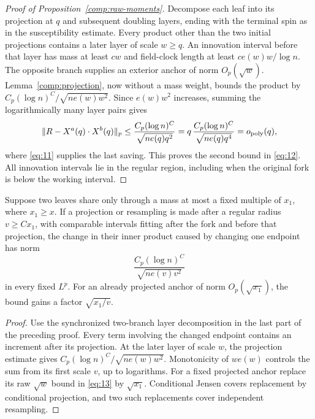 \begin{proof}[Proof of Proposition~\ref{comp:raw-moments}]
Decompose each leaf into its projection at $q$ and subsequent doubling
layers, ending with the terminal spin as in the susceptibility estimate.
Every product other than the two initial projections contains a later
layer of scale $w\ge q$.  An innovation interval before that layer has
mass at least $cw$ and field-clock length at least
$ce(w)w/\log n$.  The opposite branch supplies an exterior anchor of
norm $O_p(\sqrt w)$.  Lemma~\ref{comp:projection}, now without a
mass weight, bounds the product by
$C_p(\log n)^C/\sqrt{ne(w)w^2}$.
Since $e(w)w^2$ increases, summing the logarithmically many layer pairs
gives
\[
 \|R-X^a(q)\cdot X^b(q)\|_p
 \le\frac{C_p(\log n)^C}{\sqrt{ne(q)q^2}}
 =q\,\frac{C_p(\log n)^C}{\sqrt{ne(q)q^4}}
 =o_{\rm poly}(q),
\]
where \eqref{eq:11} supplies the last saving.  This proves the second
bound in \eqref{eq:12}.  All innovation intervals lie in the regular
region, including when the original fork is below the working interval.
\end{proof}

\begin{lemma}\label{comp:resampling}
Suppose two leaves share only through a mass at most a fixed multiple
of $x_1$, where $x_1\ge x$.  If a projection or resampling is made after
a regular radius $v\ge Cx_1$, with comparable intervals fitting after
the fork and before that projection, the change in their inner product
caused by changing one endpoint has norm
\begin{equation}
 \frac{C_p(\log n)^C}{\sqrt{ne(v)v^2}}
 \tag{16}\label{eq:16}
\end{equation}
in every fixed $L^p$.  For an already projected anchor of norm
$O_p(\sqrt{x_1})$, the bound gains a factor $\sqrt{x_1/v}$.
\end{lemma}

\begin{proof}
Use the synchronized two-branch layer decomposition in the last part
of the preceding proof.  Every term involving the changed endpoint
contains an increment after its projection.  At the later layer of
scale $w$, the projection estimate gives
$C_p(\log n)^C/\sqrt{ne(w)w^2}$.  Monotonicity of $we(w)$ controls
the sum from its first scale $v$, up to logarithms.  For a fixed
projected anchor replace its raw $\sqrt w$ bound in
\eqref{eq:13} by $\sqrt{x_1}$.  Conditional Jensen covers replacement
by conditional projection, and two such replacements cover independent
resampling.
\end{proof}

